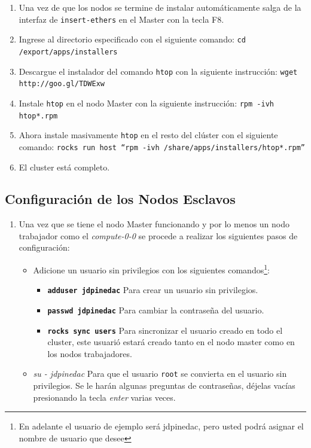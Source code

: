 \begin{enumerate}
\item Una vez de que los nodos se termine de instalar automáticamente salga de la interfaz de \texttt{insert-ethers} en el Master con la tecla F8.

\item Ingrese al directorio especificado con el siguiente comando: \texttt{cd /export/apps/installers}

\item Descargue el instalador del comando \texttt{htop} con la siguiente instrucción: \texttt{wget http://goo.gl/TDWExw}

\item Instale \texttt{htop} en el nodo Master con la siguiente instrucción: \texttt{rpm -ivh htop*.rpm}

\item Ahora instale masivamente \texttt{htop} en el resto del clúster con el siguiente comando: \texttt{rocks run host ``rpm -ivh /share/apps/installers/htop*.rpm''}

\item El cluster está completo.

\end{enumerate}

\subsection{Configuración de los Nodos Esclavos}

\begin{enumerate}
	\item Una vez que se tiene el nodo Master funcionando y por lo menos un nodo trabajador como el \textit{compute-0-0} se procede a realizar los siguientes pasos de configuración:

	\begin{itemize}
	\item Adicione un usuario sin privilegios con los siguientes comandos\footnote{En adelante el usuario de ejemplo será jdpinedac, pero usted podrá asignar el nombre de usuario que desee}:

	\begin{itemize}
		\item \textbf{\texttt{adduser jdpinedac}} Para crear un usuario sin privilegios.

		\item \textbf{\texttt{passwd jdpinedac}} Para cambiar la contraseña del usuario.

		\item \textbf{\texttt{rocks sync users}} Para sincronizar el usuario creado en todo el cluster, este usuarió estará creado tanto en el nodo master como en los nodos trabajadores.
	\end{itemize}

	\item \textit{su - jdpinedac} Para que el usuario \texttt{root} se convierta en el usuario sin privilegios. Se le harán algunas preguntas de contraseñas, déjelas vacías presionando la tecla \textit{enter} varias veces.
	\end{itemize}
	
\end{enumerate}



